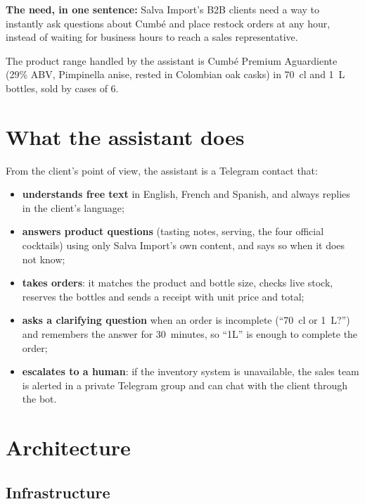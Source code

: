 \documentclass[11pt,a4paper]{article}
\begin{document}
\textbf{The need, in one sentence:} Salva Import's B2B clients need a way to instantly ask
questions about Cumbé and place restock orders at any hour, instead of waiting for business
hours to reach a sales representative.

The product range handled by the assistant is Cumbé Premium Aguardiente (29\% ABV, Pimpinella
anise, rested in Colombian oak casks) in 70~cl and 1~L bottles, sold by cases of 6.

\section{What the assistant does}
From the client's point of view, the assistant is a Telegram contact that:
\begin{itemize}
  \item \textbf{understands free text} in English, French and Spanish, and always replies in the
        client's language;
  \item \textbf{answers product questions} (tasting notes, serving, the four official cocktails)
        using only Salva Import's own content, and says so when it does not know;
  \item \textbf{takes orders}: it matches the product and bottle size, checks live stock,
        reserves the bottles and sends a receipt with unit price and total;
  \item \textbf{asks a clarifying question} when an order is incomplete (``70~cl or 1~L?'') and
        remembers the answer for 30~minutes, so ``1L'' is enough to complete the order;
  \item \textbf{escalates to a human}: if the inventory system is unavailable, the sales team is
        alerted in a private Telegram group and can chat with the client through the bot.
\end{itemize}

\section{Architecture}
\subsection{Infrastructure}
\end{document}
